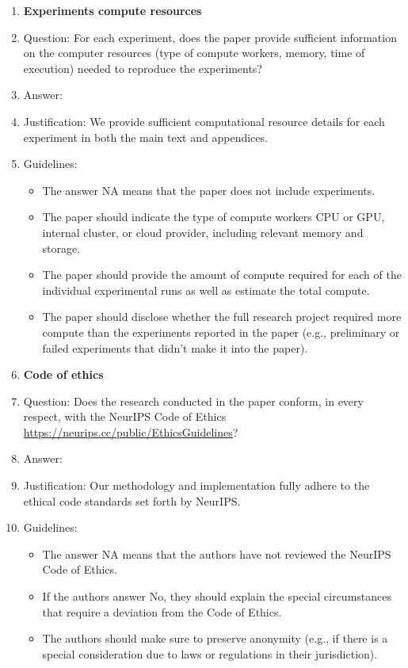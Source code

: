 \documentclass{article}
\begin{document}
\begin{enumerate}
\item {\bf Experiments compute resources}
    \item[] Question: For each experiment, does the paper provide sufficient information on the computer resources (type of compute workers, memory, time of execution) needed to reproduce the experiments?
    \item[] Answer:  \answerYes{} %
    \item[] Justification: We provide sufficient computational resource details for each experiment in both the main text and appendices.
    \item[] Guidelines:
    \begin{itemize}
        \item The answer NA means that the paper does not include experiments.
        \item The paper should indicate the type of compute workers CPU or GPU, internal cluster, or cloud provider, including relevant memory and storage.
        \item The paper should provide the amount of compute required for each of the individual experimental runs as well as estimate the total compute. 
        \item The paper should disclose whether the full research project required more compute than the experiments reported in the paper (e.g., preliminary or failed experiments that didn't make it into the paper). 
    \end{itemize}
    
\item {\bf Code of ethics}
    \item[] Question: Does the research conducted in the paper conform, in every respect, with the NeurIPS Code of Ethics \url{https://neurips.cc/public/EthicsGuidelines}?
    \item[] Answer: \answerYes{} %
    \item[] Justification: Our methodology and implementation fully adhere to the ethical code standards set forth by NeurIPS.
    \item[] Guidelines:
    \begin{itemize}
        \item The answer NA means that the authors have not reviewed the NeurIPS Code of Ethics.
        \item If the authors answer No, they should explain the special circumstances that require a deviation from the Code of Ethics.
        \item The authors should make sure to preserve anonymity (e.g., if there is a special consideration due to laws or regulations in their jurisdiction).
    \end{itemize}



\end{enumerate}
\end{document}
